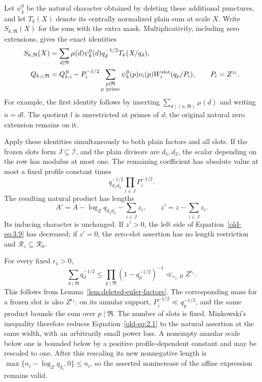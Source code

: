 \documentclass[12pt]{article}
\begin{document}
Let \(\psi_k^0\) be the natural character obtained by deleting these
additional punctures, and let \(T_k(X)\) denote its centrally
normalized plain sum at scale \(X\).  Write \(S_{k,\mathfrak R}(X)\)
for the sum with the extra mask.  Multiplicativity, including zero
extensions, gives the exact identities
\begin{align}
 S_{k,\mathfrak R}(X)
 &=\sum_{d\mid\mathfrak R}\mu(d)\psi_k^0(d)q_d^{-1/2}
                  T_k(X/q_d),
 \label{old-eq:2.1a}\\
 Q_{k,i,\mathfrak R}
 &=Q_{k,i}^{\,0}
   -P_i^{-1/2}\sum_{\substack{p\mid\mathfrak R\\p\ {\rm prime}}}
       \psi_k^0(p)\nu_i(p)W_i^{\rm slot}(q_p/P_i),
 \qquad P_i=Z^{z_i}.
 \label{eq:prime-mask-erasure}
\end{align}
For example, the first identity follows by inserting
\(\sum_{d\mid(n,\mathfrak R)}\mu(d)\) and writing \(n=dl\).
The quotient \(l\) is unrestricted at primes of \(d\); the original
natural zero extension remains on it.

Apply these identities simultaneously to both plain factors and all
slots.  If the frozen slots form \(J\subseteq\mathcal I\), and the
plain divisors are \(d_1,d_2\), the scalar depending on the row has
modulus at most one.  The remaining coefficient has absolute value at
most a fixed profile constant times
\[
 q_{d_1d_2}^{-1/2}\prod_{i\in J}P_i^{-1/2}.
\]
The resulting natural product has lengths
\[
 A'=A-\log_Zq_{d_1d_2}-\sum_{i\in J}z_i,\qquad
 z'=z-\sum_{i\in J}z_i.
\]
Its inducing character is unchanged.  If \(z'>0\), the left side of
Equation~\eqref{old-eq:3.9} has decreased; if \(z'=0\), the zero-slot
assertion has no length restriction and
\(\mathcal R_z\subseteq\mathcal R_0\).

For every fixed \(\epsilon_1>0\),
\begin{equation}
 \sum_{d\mid\mathfrak R}q_d^{-1/2}
 \le \prod_{p\mid\mathfrak R}(1-q_p^{-1/2})^{-1}
 \ll_{\epsilon_1,B} Z^{\epsilon_1}.
 \label{old-eq:2.1b}
\end{equation}
This follows from Lemma~\ref{lem:deleted-euler-factors}.  The corresponding
mass for a frozen slot is also \(Z^{\epsilon_1}\): on its annular support,
\(P_i^{-1/2}\ll q_p^{-1/2}\), and the same product bounds the sum over
\(p\mid\mathfrak R\).  The number of slots is fixed.  Minkowski's
inequality therefore reduces Equation~\eqref{old-eq:2.1} to the
natural assertion at the same width, with an arbitrarily small power
loss.  A nonempty annular scale below one is bounded below by a
positive profile-dependent constant and may be rescaled to one.
After this rescaling its new nonnegative length is
\(\max\{n_i-\log_Zq_{d_i},0\}\le n_i\), so the asserted
nonincrease of the affine expression remains valid.
\end{document}
